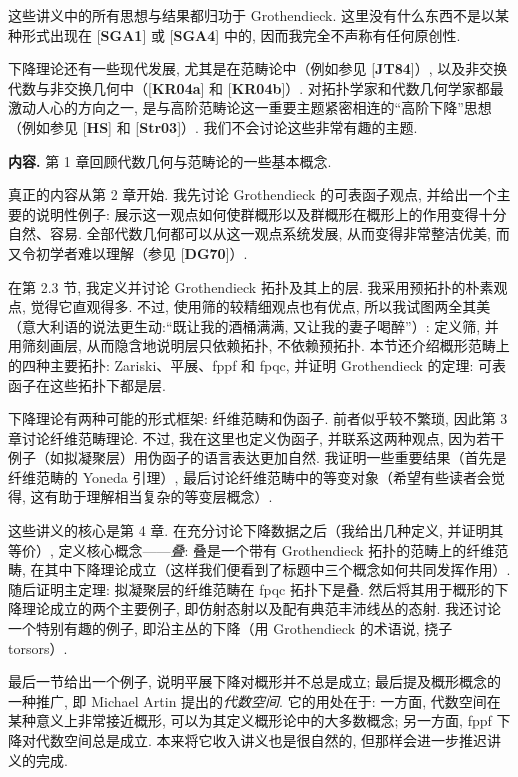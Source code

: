 这些讲义中的所有思想与结果都归功于 Grothendieck. 这里没有什么东西不是以某种形式出现在 [\textbf{SGA1}] 或 [\textbf{SGA4}] 中的, 因而我完全不声称有任何原创性.

下降理论还有一些现代发展, 尤其是在范畴论中（例如参见 [\textbf{JT84}]）, 以及非交换代数与非交换几何中（[\textbf{KR04a}] 和 [\textbf{KR04b}]）. 对拓扑学家和代数几何学家都最激动人心的方向之一, 是与高阶范畴论这一重要主题紧密相连的“高阶下降”思想（例如参见 [\textbf{HS}] 和 [\textbf{Str03}]）. 我们不会讨论这些非常有趣的主题.

\medskip\noindent\textbf{内容.}
第 1 章回顾代数几何与范畴论的一些基本概念.

真正的内容从第 2 章开始. 我先讨论 Grothendieck 的可表函子观点, 并给出一个主要的说明性例子: 展示这一观点如何使群概形以及群概形在概形上的作用变得十分自然、容易. 全部代数几何都可以从这一观点系统发展, 从而变得非常整洁优美, 而又令初学者难以理解（参见 [\textbf{DG70}]）.

在第 2.3 节, 我定义并讨论 Grothendieck 拓扑及其上的层. 我采用预拓扑的朴素观点, 觉得它直观得多. 不过, 使用筛的较精细观点也有优点, 所以我试图两全其美（意大利语的说法更生动:“既让我的酒桶满满, 又让我的妻子喝醉”）: 定义筛, 并用筛刻画层, 从而隐含地说明层只依赖拓扑, 不依赖预拓扑. 本节还介绍概形范畴上的四种主要拓扑: Zariski、平展、fppf 和 fpqc, 并证明 Grothendieck 的定理: 可表函子在这些拓扑下都是层.

下降理论有两种可能的形式框架: 纤维范畴和伪函子. 前者似乎较不繁琐, 因此第 3 章讨论纤维范畴理论. 不过, 我在这里也定义伪函子, 并联系这两种观点, 因为若干例子（如拟凝聚层）用伪函子的语言表达更加自然. 我证明一些重要结果（首先是纤维范畴的 Yoneda 引理）, 最后讨论纤维范畴中的等变对象（希望有些读者会觉得, 这有助于理解相当复杂的等变层概念）.

这些讲义的核心是第 4 章. 在充分讨论下降数据之后（我给出几种定义, 并证明其等价）, 定义核心概念——\emph{叠}: 叠是一个带有 Grothendieck 拓扑的范畴上的纤维范畴, 在其中下降理论成立（这样我们便看到了标题中三个概念如何共同发挥作用）. 随后证明主定理: 拟凝聚层的纤维范畴在 fpqc 拓扑下是叠. 然后将其用于概形的下降理论成立的两个主要例子, 即仿射态射以及配有典范丰沛线丛的态射. 我还讨论一个特别有趣的例子, 即沿主丛的下降（用 Grothendieck 的术语说, 挠子 torsors）.

最后一节给出一个例子, 说明平展下降对概形并不总是成立; 最后提及概形概念的一种推广, 即 Michael Artin 提出的\emph{代数空间}. 它的用处在于: 一方面, 代数空间在某种意义上非常接近概形, 可以为其定义概形论中的大多数概念; 另一方面, fppf 下降对代数空间总是成立. 本来将它收入讲义也是很自然的, 但那样会进一步推迟讲义的完成.

